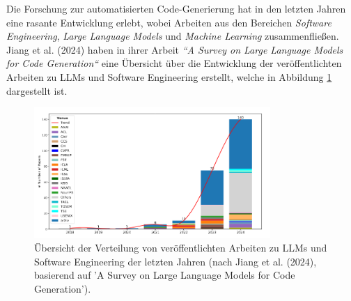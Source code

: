 \documentclass[11pt,a4paper]{article}
\begin{document}
Die Forschung zur automatisierten Code-Generierung hat in den letzten Jahren eine rasante Entwicklung erlebt, wobei Arbeiten aus den Bereichen \emph{Software Engineering}, \emph{Large Language Models} und \emph{Machine Learning} zusammenfließen. Jiang et al. (2024) haben in ihrer Arbeit \emph{``A Survey on Large Language Models for Code Generation``} eine Übersicht über die Entwicklung der veröffentlichten Arbeiten zu LLMs und Software Engineering erstellt, welche in Abbildung \ref{fig:entwicklung_paper} dargestellt ist.
\begin{figure}[H]
    \centering
    \includegraphics[width=0.8\textwidth]{./bilder/entwicklung_paper.png}
    \caption{Übersicht der Verteilung von veröffentlichten Arbeiten zu LLMs und Software Engineering der letzten Jahren (nach Jiang et al. (2024), basierend auf 'A Survey on Large Language Models for Code Generation'\cite{jiang2024surveylargelanguagemodels}).}
    \label{fig:entwicklung_paper}
\end{figure}
\end{document}
